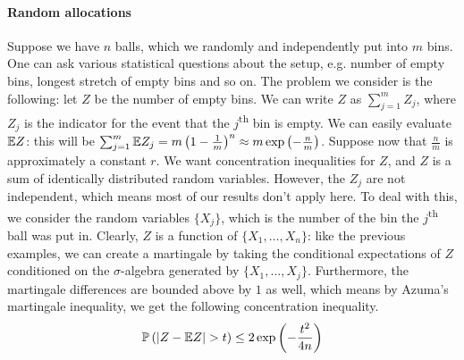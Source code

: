 \documentclass[11pt]{article}
\begin{document}
\paragraph{Random allocations}

Suppose we have $n$ balls, which we randomly and independently put into $m$ bins.
One can ask various statistical questions about the setup, e.g. number of empty bins, longest stretch of empty bins and so on.
The problem we consider is the following: let $Z$ be the number of empty bins.
We can write $Z$ as $\sum_{j=1}^m Z_j$, where $Z_j$ is the indicator for the event that the $j$\textsuperscript{th} bin is empty.
We can easily evaluate $\mathbb{E} Z$: this will be $\sum_{j=1}^m \mathbb{E} Z_j = m \left( 1 - \frac{1}{m} \right)^n \approx m \exp \left( - \frac{n}{m} \right)$.
Suppose now that $\frac{n}{m}$ is approximately a constant $r$.
We want concentration inequalities for $Z$, and $Z$ is a sum of identically distributed random variables.
However, the $Z_j$ are not independent, which means most of our results don't apply here.
To deal with this, we consider the random variables $\{X_j\}$, which is the number of the bin the $j$\textsuperscript{th} ball was put in.
Clearly, $Z$ is a function of $\{X_1, \ldots, X_n\}$: like the previous examples, we can create a martingale by taking the conditional expectations of $Z$ conditioned on the $\sigma$-algebra generated by $\{X_1, \ldots, X_j\}$.
Furthermore, the martingale differences are bounded above by $1$ as well, which means by Azuma's martingale inequality, we get the following concentration inequality.
\begin{align}
  \label{eq:weak-bound}
  \mathbb{P}\left( \left| Z - \mathbb{E} Z \right| > t \right) \leq 2 \exp \left( - \frac{t^2}{4n} \right)
\end{align}
\end{document}
